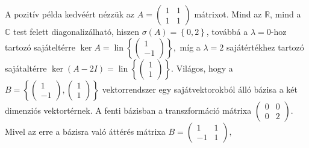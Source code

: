 \documentclass[9pt, a4paper, showtrims]{memoir}
\theoremstyle{plain}
\theoremstyle{remark}
\theoremstyle{definition}
\DeclareMathOperator{\lin}{lin}
\begin{document}
    A pozitív példa kedvéért nézzük az 
    \begin{math}
        A
        =
        \begin{pmatrix}
            1&1\\1&1
        \end{pmatrix}
    \end{math}
    mátrixot. 
    Mind az $\mathbb{R}$,
    mind a $\mathbb{C}$ test felett diagonalizálható,
    hiszen $\sigma\left( A \right)=\left\{ 0,2 \right\}$, továbbá
    a $\lambda=0$-hoz tartozó sajáteltérre 
    $\ker A=\lin\left\{ 
        \begin{pmatrix}
            1\\-1
        \end{pmatrix}
    \right\},$
    míg a $\lambda=2$ sajátértékhez tartozó sajátaltérre
    \begin{math}
        \ker\left( A-2I \right)
        =
        \lin\left\{ 
            \begin{pmatrix}
                1\\1
            \end{pmatrix}
        \right\}.
    \end{math}
    Világos, hogy a
    \begin{math}
        B
        =
        \left\{ 
            \begin{pmatrix}
                1\\-1
            \end{pmatrix},
            \begin{pmatrix}
                1\\1
            \end{pmatrix}
        \right\}
    \end{math}
    vektorrendszer egy sajátvektorokból álló bázisa a két dimenziós vektortérnek.
    A fenti bázisban a transzformáció mátrixa
    \begin{math}
        \begin{pmatrix}
            0&0\\
            0&2
        \end{pmatrix}.
    \end{math}
    Mivel az erre a bázisra való áttérés mátrixa
    \begin{math}
        B=
        \begin{pmatrix}
            1&1\\
            -1&1
        \end{pmatrix},
    \end{math}
\end{document}
